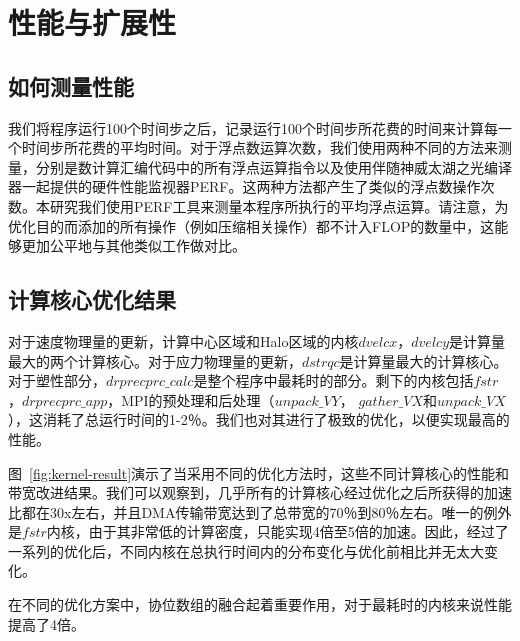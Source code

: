 \documentclass[degree=doctor]{thuthesis}
\begin{document}
\section{性能与扩展性}

\subsection{如何测量性能}

我们将程序运行100个时间步之后，记录运行100个时间步所花费的时间来计算每一个时间步所花费的平均时间。对于浮点数运算次数，我们使用两种不同的方法来测量，分别是数计算汇编代码中的所有浮点运算指令以及使用伴随神威太湖之光编译器一起提供的硬件性能监视器PERF。这两种方法都产生了类似的浮点数操作次数。本研究我们使用PERF工具来测量本程序所执行的平均浮点运算。请注意，为优化目的而添加的所有操作（例如压缩相关操作）都不计入FLOP的数量中，这能够更加公平地与其他类似工作做对比。

\subsection{计算核心优化结果}

对于速度物理量的更新，计算中心区域和Halo区域的内核$ dvelcx，dvelcy $是计算量最大的两个计算核心。对于应力物理量的更新，$ dstrqc $是计算量最大的计算核心。对于塑性部分，$ drprecprc\_calc $是整个程序中最耗时的部分。剩下的内核包括$ fstr $，$ drprecprc\_app $，MPI的预处理和后处理（$ unpack\_VY $，
$ gather\_VX $和$ unpack\_VX $），这消耗了总运行时间的1-2％。我们也对其进行了极致的优化，以便实现最高的性能。

图~\ref{fig:kernel-result}演示了当采用不同的优化方法时，这些不同计算核心的性能和带宽改进结果。我们可以观察到，几乎所有的计算核心经过优化之后所获得的加速比都在30x左右，并且DMA传输带宽达到了总带宽的70％到80％左右。唯一的例外是$ fstr $内核，由于其非常低的计算密度，只能实现4倍至5倍的加速。因此，经过了一系列的优化后，不同内核在总执行时间内的分布变化与优化前相比并无太大变化。

在不同的优化方案中，协位数组的融合起着重要作用，对于最耗时的内核来说性能提高了4倍。
\end{document}
